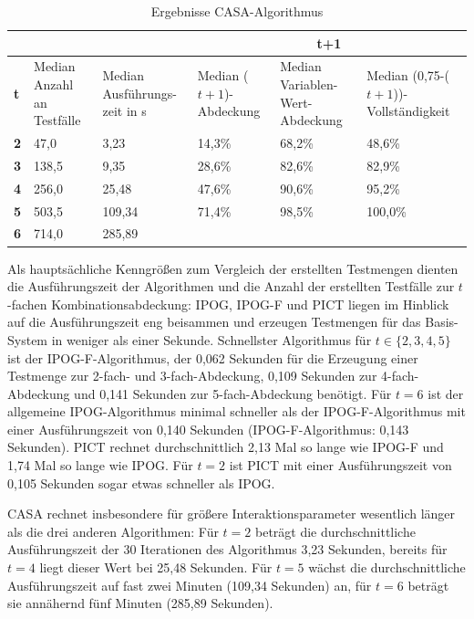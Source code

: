 \begin{table}[!htb]
\footnotesize
\begin{tabular}{|M{0.06\textwidth}|M{}|M{}||M{}|M{}|M{}|}
\hline
  &     &       &                                             \\ \hline
\textbf{t} & Median Anzahl an Testfälle & Median Ausführungs- zeit in s & Median ($t+1$)-Abdeckung & Median Variablen-Wert-Abdeckung & Median (0,75-($t+1$))-Vollständigkeit \\ \hline
\textbf{2} & 47,0    & 3,23   & 14,3\% & 68,2\% & 48,6\%  \\
\textbf{3} & 138,5 & 9,35   & 28,6\% & 82,6\% & 82,9\%  \\
\textbf{4} & 256,0   & 25,48  & 47,6\% & 90,6\% & 95,2\%  \\
\textbf{5} & 503,5 & 109,34 & 71,4\% & 98,5\% & 100,0\% \\
\textbf{6} & 714,0  & 285,89 &        &        & \\ \hline       
\end{tabular}
\normalsize
\caption{Ergebnisse CASA-Algorithmus}
\label{tab:resultsCASA}
\end{table}

Als hauptsächliche Kenngrößen zum Vergleich der erstellten Testmengen dienten die Ausführungszeit der Algorithmen und die Anzahl der erstellten Testfälle zur $t$-fachen Kombinationsabdeckung: IPOG, IPOG-F und PICT liegen im Hinblick auf die Ausführungszeit eng beisammen und erzeugen Testmengen für das Basis-System in weniger als einer Sekunde. Schnellster Algorithmus für $t \in \{2,3,4,5\}$ ist der IPOG-F-Algorithmus, der 0,062 Sekunden für die Erzeugung einer Testmenge zur 2-fach- und 3-fach-Abdeckung, 0,109 Sekunden zur 4-fach-Abdeckung und 0,141 Sekunden zur 5-fach-Abdeckung benötigt. Für $t=6$ ist der allgemeine IPOG-Algorithmus minimal schneller als der IPOG-F-Algorithmus mit einer Ausführungszeit von 0,140 Sekunden (IPOG-F-Algorithmus: 0,143 Sekunden). PICT rechnet durchschnittlich 2,13 Mal so lange wie IPOG-F und 1,74 Mal so lange wie IPOG. Für $t=2$ ist PICT mit einer Ausführungszeit von 0,105 Sekunden sogar etwas schneller als IPOG.

CASA rechnet insbesondere für größere Interaktionsparameter wesentlich länger als die drei anderen Algorithmen: Für $t=2$ beträgt die durchschnittliche Ausführungszeit der 30 Iterationen des Algorithmus 3,23 Sekunden, bereits für $t=4$ liegt dieser Wert bei 25,48 Sekunden. Für $t=5$ wächst die durchschnittliche Ausführungszeit auf fast zwei Minuten (109,34 Sekunden) an, für $t=6$ beträgt sie annähernd fünf Minuten (285,89 Sekunden). 

